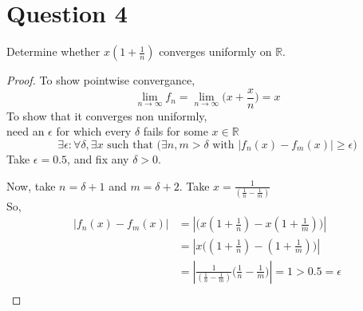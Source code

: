 \documentclass[20pt,a4paper]{extarticle} %
\theoremstyle{definition}
\theoremstyle{definition}
\begin{document}
\section*{Question 4}
Determine whether $x(1+ \frac{1}{n} )$ converges uniformly on $\mathbb{R}$.
\begin{proof}
To show pointwise convergance,
\[ \lim_{n \to \infty} f_n = \lim_{n \to \infty} \big( x + \frac{x}{n} \big) = x \]
To show that it converges non uniformly,\\
need an $\epsilon$ for which every $\delta$ fails for some $x \in \mathbb{R}$
\[ \exists \epsilon : \forall \delta, \exists x \text{ such that }
	\Big( \exists n,m> \delta \text{ with } |f_n(x) - f_m(x)| \geq \epsilon \Big) \]
	Take $\epsilon = 0.5$, and fix any $\delta>0$.

	Now, take $n=\delta+1$ and $m=\delta+2$.
	Take $x= \frac{1}{(\frac{1}{n} - \frac{1}{m})}$\\
	So,
	\begin{align*}
		|f_n(x) - f_m(x)|&=|\Big(x(1+ \frac{1}{n} )-x(1+ \frac{1}{m}) \Big)|\\
			 &=|x\Big((1+ \frac{1}{n} )-(1+ \frac{1}{m} )\Big)|\\
			 &=|\frac{1}{(\frac{1}{n} - \frac{1}{m})}
			 \big(\frac{1}{n} -\frac{1}{m} \big)|=1>0.5=\epsilon\\
	\end{align*}
\end{proof}
\newpage
\end{document}
